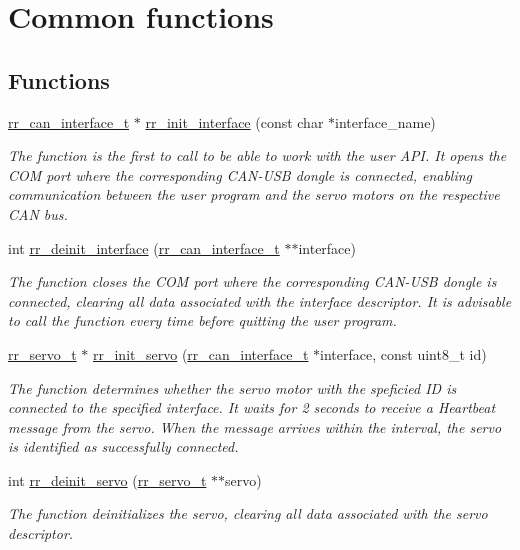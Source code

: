 \hypertarget{group___common}{}\section{Common functions}
\label{group___common}
\subsection*{Functions}
\begin{DoxyCompactItemize}
\item 
\hyperlink{structrr__can__interface__t}{rr\+\_\+can\+\_\+interface\+\_\+t} $\ast$ \hyperlink{group___common_ga472a4890dcc7d7a13123c56a06946d91}{rr\+\_\+init\+\_\+interface} (const char $\ast$interface\+\_\+name)
\begin{DoxyCompactList}\small\item\em The function is the first to call to be able to work with the user A\+PI. It opens the C\+OM port where the corresponding C\+A\+N-\/\+U\+SB dongle is connected, enabling communication between the user program and the servo motors on the respective C\+AN bus. \end{DoxyCompactList}\item 
int \hyperlink{group___common_ga10cbfcf4b80ebfd0d4df74441bbbe91a}{rr\+\_\+deinit\+\_\+interface} (\hyperlink{structrr__can__interface__t}{rr\+\_\+can\+\_\+interface\+\_\+t} $\ast$$\ast$interface)
\begin{DoxyCompactList}\small\item\em The function closes the C\+OM port where the corresponding C\+A\+N-\/\+U\+SB dongle is connected, clearing all data associated with the interface descriptor. It is advisable to call the function every time before quitting the user program. \end{DoxyCompactList}\item 
\hyperlink{structrr__servo__t}{rr\+\_\+servo\+\_\+t} $\ast$ \hyperlink{group___common_ga0adb313a3eeb8a4399431e940a1f3e9e}{rr\+\_\+init\+\_\+servo} (\hyperlink{structrr__can__interface__t}{rr\+\_\+can\+\_\+interface\+\_\+t} $\ast$interface, const uint8\+\_\+t id)
\begin{DoxyCompactList}\small\item\em The function determines whether the servo motor with the speficied ID is connected to the specified interface. It waits for 2 seconds to receive a Heartbeat message from the servo. When the message arrives within the interval, the servo is identified as successfully connected.~\newline
 \end{DoxyCompactList}\item 
int \hyperlink{group___common_gafebc52982ef705b8d0f805d5ee5ca9f7}{rr\+\_\+deinit\+\_\+servo} (\hyperlink{structrr__servo__t}{rr\+\_\+servo\+\_\+t} $\ast$$\ast$servo)
\begin{DoxyCompactList}\small\item\em The function deinitializes the servo, clearing all data associated with the servo descriptor. \end{DoxyCompactList}\end{DoxyCompactItemize}


